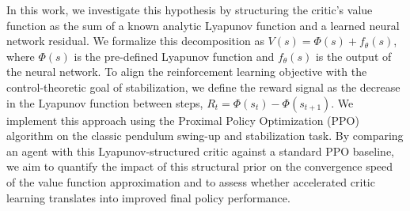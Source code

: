 \documentclass[]{article}
\begin{document}
In this work, we investigate this hypothesis by structuring the critic's value function as the sum of a known analytic Lyapunov function and a learned neural network residual. We formalize this decomposition as $V(s) = \Phi(s) + f_\theta(s)$, where $\Phi(s)$ is the pre-defined Lyapunov function and $f_\theta(s)$ is the output of the neural network. To align the reinforcement learning objective with the control-theoretic goal of stabilization, we define the reward signal as the decrease in the Lyapunov function between steps, $R_t = \Phi(s_t) - \Phi(s_{t+1})$. We implement this approach using the Proximal Policy Optimization (PPO) algorithm on the classic pendulum swing-up and stabilization task. By comparing an agent with this Lyapunov-structured critic against a standard PPO baseline, we aim to quantify the impact of this structural prior on the convergence speed of the value function approximation and to assess whether accelerated critic learning translates into improved final policy performance.
\end{document}
